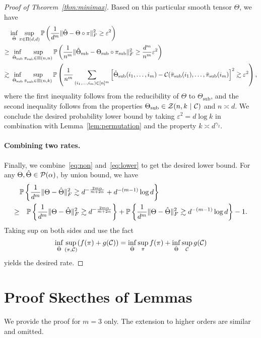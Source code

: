 \documentclass[11pt]{article}
\theoremstyle{definition}
\begin{document}
\begin{proof}[Proof of Theorem~\ref{thm:minimax}]
Based on this particular smooth tensor $\Theta$, we have
\begin{align}\label{eq:lower}
&\inf_{\hat \Theta}\sup_{\pi\in \Pi(d,d)}\mathbb{P}\left({1\over d^m}\FnormSize{}{\hat \Theta-\Theta\circ \pi}^2\geq \varepsilon^2\right)\notag \\
\geq & \ \inf_{\hat  \Theta_{\text{sub}}}\sup_{\pi_{\text{sub}}\in\Pi(n,n)}\mathbb{P}\left({1\over n^m}\FnormSize{}{\hat \Theta_\text{sub}-\Theta_{\text{sub}}\circ \pi_{\text{sub}}}^2\geq {d^m\over n^m} \varepsilon^2\right)\notag \\
\gtrsim & \ \inf_{\hat  \Theta_{\text{sub}}}\sup_{\bar \pi_{\text{sub}}\in\Pi(n,k)}\mathbb{P}\left({1\over n^m}\sum_{(i_1,\ldots,i_m)\in[n]^m}\left[\hat \Theta_\text{sub}(i_1,\ldots,i_m)-\tC(\bar \pi_{\text{sub}}(i_1),\ldots,\bar \pi_{\text{sub}}(i_m)\right]^2\gtrsim \varepsilon^2\right),
\end{align}
where the first inequality follows from the reducibility of $\Theta$ to $\Theta_{\text{sub}}$, and the second inequality follows from the properties $\Theta_{\text{sub}}\in \mathcal{Z}(n,k\ |\ \mathcal{C})$ and $n\asymp d$. 
We conclude the desired probability lower bound by taking $\varepsilon^2={d\log k }$ in combination with Lemma~\ref{lem:permutation} and the property $k\asymp d^{\gamma_2}$.


\paragraph{Combining two rates.} Finally, we combine~\eqref{eq:non} and~\eqref{eq:lower} to get the desired lower bound. For any $\Theta, \hat \Theta \in \mathcal{P}(\alpha)$, by union bound, we have
\begin{align}
&\mathbb{P}\left\{ {1\over d^m}\lVert\Theta-\hat \Theta\rVert_F^2\gtrsim d^{-{2m\alpha\over m+2\alpha}}+d^{-(m-1)}\log d\right\}\\
\geq &\quad \mathbb{P}\left\{ {1\over d^m}\lVert\Theta-\hat \Theta\rVert_F^2\gtrsim d^{-{2m\alpha\over m+2\alpha}}\right\} +\mathbb{P}\left\{ {1\over d^m}\lVert\Theta-\hat \Theta\rVert_F^2\gtrsim d^{-(m-1)}\log d\right\}-1.
\end{align}
Taking sup on both sides and use the fact 
\[
\inf_{\hat \Theta}\sup_{(\pi,\mathcal{C})}(f(\pi)+g(\mathcal{C}))=\inf_{\hat \Theta}\sup_{\pi}f(\pi)+\inf_{\hat \Theta}\sup_{\mathcal{C}}g(\mathcal{C})
\]
yields the desired rate. 
\end{proof}

\section{Proof Skecthes of Lemmas}
We provide the proof for $m=3$ only. The extension to higher orders are similar and omitted. 
\end{document}
